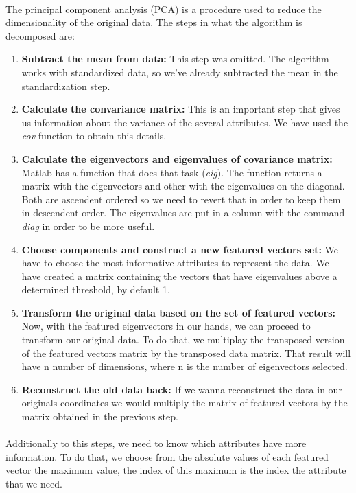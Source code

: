 \documentclass[12pt, a4paper]{article}
\begin{document}
\paragraph{}The principal component analysis (PCA) is a procedure used to reduce the dimensionality of the original data. The steps in what the algorithm is decomposed are:
\begin{enumerate}
	\item \textbf{Subtract the mean from data: }This step was omitted. The algorithm works with standardized data, so we've already subtracted the mean in the standardization step.
	\item \textbf{Calculate the convariance matrix:} This is an important step that gives us information about the variance of the several attributes. We have used the \emph{cov} function to obtain this details.
	\item \textbf{Calculate the eigenvectors and eigenvalues of covariance matrix:} Matlab has a function that does that task (\emph{eig}). The function returns a matrix with the eigenvectors and other with the eigenvalues on the diagonal. Both are ascendent ordered so we need to revert that in order to keep them in descendent order. The eigenvalues are put in a column with the command \emph{diag} in order to be more useful.
	\item \textbf{Choose components and construct a new featured vectors set:} We have to choose the most informative attributes to represent the data. We have created a matrix containing the vectors that have eigenvalues above a determined threshold, by default 1.
	\item \textbf{Transform the original data based on the set of featured vectors:} Now, with the featured eigenvectors in our hands, we can proceed to transform our original data. To do that, we multiplay the transposed version of the featured vectors matrix by the transposed data matrix. That result will have n number of dimensions, where n is the number of eigenvectors selected.
	\item \textbf{Reconstruct the old data back:} If we wanna reconstruct the data in our originals coordinates we would multiply the matrix of featured vectors by the matrix obtained in the previous step.
\end{enumerate}
\paragraph{}Additionally to this steps, we need to know which attributes have more information. To do that, we choose from the absolute values of each featured vector the maximum value, the index of this maximum is the index the attribute that we need.
\end{document}
